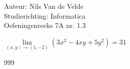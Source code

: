 \documentclass[a4paper]{article}
\newcommand{\llim}{\lim\limits}
\begin{document}
  
\noindent \large Auteur: Nils Van de Velde \\
\noindent \large Studierichting: Informatica\\
\noindent \large Oefeningenreeks 7A nr. 1.3\\

\medskip

\normalsize

$\llim_{(x,y) \rightarrow (1,-2)} (3x^2 -4xy +5y^2) = 31$\\

\begin{thebibliography}{999}
\end{thebibliography}
\end{document}
